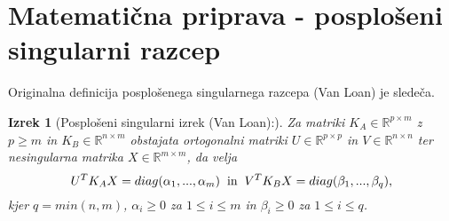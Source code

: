 \documentclass[mat1]{article}
\newtheorem{izrek}{Izrek}
\begin{document}
\section{Matematična priprava - posplošeni singularni razcep}
Originalna definicija posplošenega singularnega razcepa (Van Loan) je sledeča.
\begin{izrek}[Posplošeni singularni izrek (Van Loan):]
\label{izrek:SVD} Za matriki $K_A \in \mathbb{R}^{p \times m}$ z $p \geq m$ in $K_B \in \mathbb{R}^{n \times m}$ obstajata ortogonalni matriki $U \in \mathbb{R}^{p \times p}$ in $V \in \mathbb{R}^{n \times n}$ ter nesingularna matrika $X \in \mathbb{R}^{m \times m}$, da velja 
$$ U^T K_A X = diag(\alpha_1,..., \alpha_m) \hspace{2mm} \text{in} \hspace{2mm} V^T K_B X = diag(\beta_1,..., \beta_q) \text{,}
$$ kjer $q = min(n,m)$, $\alpha_i \geq 0$ za $1 \leq i \leq m$ in  $\beta_i \geq 0$ za  $1 \leq i \leq q$.
\end{izrek}
\end{document}
